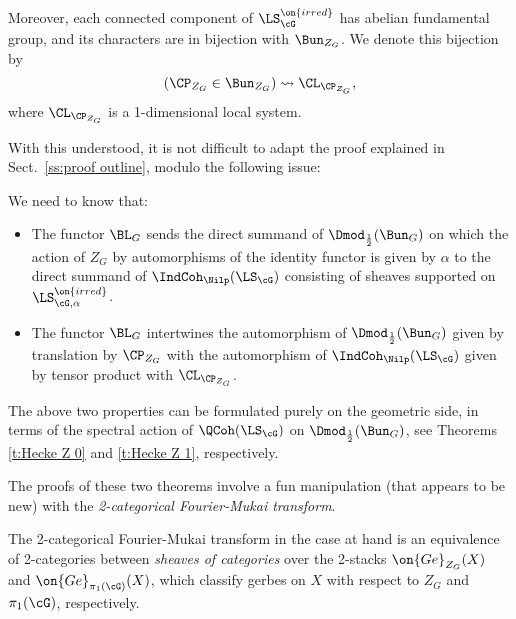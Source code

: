 \documentclass[9pt]{amsart}
\theoremstyle{remark}
\theoremstyle{definition}
\theoremstyle{remark}
\newcommand{\secref}[1]{Sect.~\ref{#1}}
\numberwithin{equation}{section}
\begin{document}
\medskip

Moreover, each 
connected component of $\LS^{\on{irred}}_\cG$ has abelian fundamental group, 
and its characters are in
bijection with $\Bun_{Z_G}$. We denote this bijection by
$$(\CP_{Z_G}\in \Bun_{Z_G})\rightsquigarrow \CL_{\CP_{Z_G}},$$
where $\CL_{\CP_{Z_G}}$ is a 1-dimensional local system.

\sssec{} \label{sss:center Intro}

With this understood, it is not difficult to adapt the proof explained in \secref{ss:proof outline}, modulo the following issue:

\medskip

We need to know that:

\begin{itemize}

\item The functor $\BL_G$ sends the direct summand of $\Dmod_{\frac{1}{2}}(\Bun_G)$ on which the action of $Z_G$
by automorphisms of the identity functor is given by $\alpha$ to the direct summand of $\IndCoh_\Nilp(\LS_{\cG})$ consisting of sheaves
supported on $\LS^{\on{irred}}_{\cG,\alpha}$.

\smallskip

\item The functor $\BL_G$ intertwines the automorphism of $\Dmod_{\frac{1}{2}}(\Bun_G)$ given by translation
by $\CP_{Z_G}$ with the automorphism of $\IndCoh_\Nilp(\LS_{\cG})$ given by 
tensor product with $\CL_{\CP_{Z_G}}$.

\end{itemize} 

\sssec{}

The above two properties can be formulated purely on the geometric side, in terms of the spectral
action of $\QCoh(\LS_\cG)$ on $\Dmod_{\frac{1}{2}}(\Bun_G)$, see Theorems \ref{t:Hecke Z 0} and
\ref{t:Hecke Z 1}, respectively.

\medskip

The proofs of these two theorems involve a fun manipulation (that appears to be new) with the \emph{2-categorical
Fourier-Mukai transform}. 

\sssec{}

The 2-categorical Fourier-Mukai transform in the case at hand is an equivalence of 2-categories 
between \emph{sheaves of categories}
over the 2-stacks $\on{Ge}_{Z_G}(X)$ and $\on{Ge}_{\pi_1(\cG)}(X)$, which classify gerbes on $X$ with respect to
$Z_G$ and $\pi_1(\cG)$, respectively. 
\end{document}
